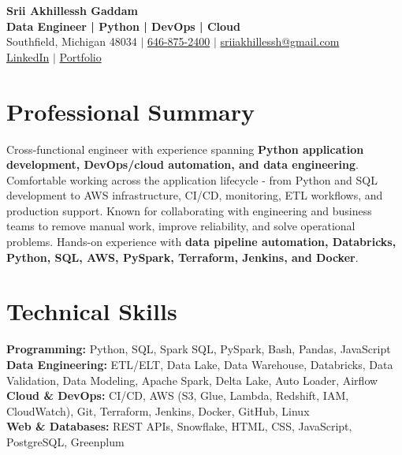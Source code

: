 \documentclass[letterpaper,10pt]{article}
\begin{document}
\fontsize{9.35pt}{10.45pt}\selectfont

\begin{center}
    {\LARGE \textbf{Srii Akhillessh Gaddam}} \\[-1pt]
    \textbf{Data Engineer | Python | DevOps | Cloud} \\[2pt]
    Southfield, Michigan 48034 $|$
    \href{tel:6468752400}{646-875-2400} $|$
    \href{mailto:sriiakhillessh@gmail.com}{sriiakhillessh@gmail.com} \\[1pt]
    \href{https://www.linkedin.com/in/srii-akhiilessh-gaddam-b48668191/}{LinkedIn} $|$
    \href{https://sriiakhillesshg.github.io/portfolio/}{Portfolio}
\end{center}
\vspace{-8pt}

\section{Professional Summary}
\small{Cross-functional engineer with experience spanning \textbf{Python application development, DevOps/cloud automation, and data engineering}. Comfortable working across the application lifecycle - from Python and SQL development to AWS infrastructure, CI/CD, monitoring, ETL workflows, and production support. Known for collaborating with engineering and business teams to remove manual work, improve reliability, and solve operational problems. Hands-on experience with \textbf{data pipeline automation, Databricks, Python, SQL, AWS, PySpark, Terraform, Jenkins, and Docker}.}

\section{Technical Skills}
\small{
\textbf{Programming:} Python, SQL, Spark SQL, PySpark, Bash, Pandas, JavaScript \\
\textbf{Data Engineering:} ETL/ELT, Data Lake, Data Warehouse, Databricks, Data Validation, Data Modeling, Apache Spark, Delta Lake, Auto Loader, Airflow \\
\textbf{Cloud \& DevOps:} CI/CD, AWS (S3, Glue, Lambda, Redshift, IAM, CloudWatch), Git, Terraform, Jenkins, Docker, GitHub, Linux \\
\textbf{Web \& Databases:} REST APIs, Snowflake, HTML, CSS, JavaScript, PostgreSQL, Greenplum
}
\end{document}
